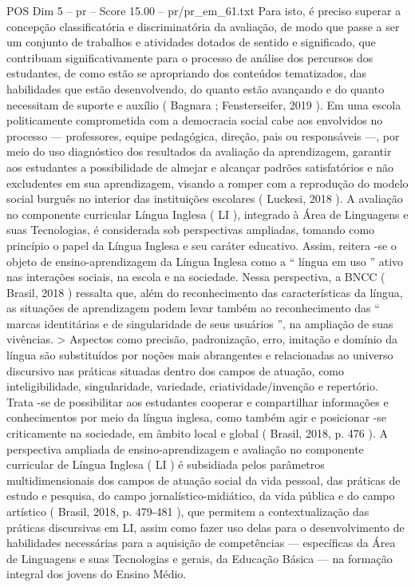 \begin{textsample}{POS Dim 5 – pr – Score 15.00 – pr/pr\_em\_61.txt}
Para isto, é preciso superar a concepção classificatória e discriminatória da avaliação, de modo que passe a ser um conjunto de trabalhos e atividades dotados de sentido e significado, que contribuam significativamente para o processo de análise dos percursos dos estudantes, de como estão se apropriando dos conteúdos tematizados, das habilidades que estão desenvolvendo, do quanto estão avançando e do quanto necessitam de suporte e auxílio ( Bagnara ; Fensterseifer, 2019 ).
Em uma escola politicamente comprometida com a democracia social cabe aos envolvidos no processo — professores, equipe pedagógica, direção, pais ou responsáveis —, por meio do uso diagnóstico dos resultados da avaliação da aprendizagem, garantir aos estudantes a possibilidade de almejar e alcançar padrões satisfatórios e não excludentes em sua aprendizagem, visando a romper com a reprodução do modelo social burguês no interior das instituições escolares ( Luckesi, 2018 ).
A avaliação no componente curricular Língua Inglesa ( LI ), integrado à Área de Linguagens e suas Tecnologias, é considerada sob perspectivas ampliadas, tomando como princípio o papel da Língua Inglesa e seu caráter educativo.
Assim, reitera -se o objeto de ensino-aprendizagem da Língua Inglesa como a “ língua em uso ” ativo nas interações sociais, na escola e na sociedade.
Nessa perspectiva, a BNCC ( Brasil, 2018 ) ressalta que, além do reconhecimento das características da língua, as situações de aprendizagem podem levar também ao reconhecimento das “ marcas identitárias e de singularidade de seus usuários ”, na ampliação de suas vivências. > Aspectos como precisão, padronização, erro, imitação e domínio da língua são substituídos por noções mais abrangentes e relacionadas ao universo discursivo nas práticas situadas dentro dos campos de atuação, como inteligibilidade, singularidade, variedade, criatividade/invenção e repertório.
Trata -se de possibilitar aos estudantes cooperar e compartilhar informações e conhecimentos por meio da língua inglesa, como também agir e posicionar -se criticamente na sociedade, em âmbito local e global ( Brasil, 2018, p. 476 ).
A perspectiva ampliada de ensino-aprendizagem e avaliação no componente curricular de Língua Inglesa ( LI ) é subsidiada pelos parâmetros multidimensionais dos campos de atuação social da vida pessoal, das práticas de estudo e pesquisa, do campo jornalístico-midiático, da vida pública e do campo artístico ( Brasil, 2018, p. 479-481 ), que permitem a contextualização das práticas discursivas em LI, assim como fazer uso delas para o desenvolvimento de habilidades necessárias para a aquisição de competências — específicas da Área de Linguagens e suas Tecnologias e gerais, da Educação Básica — na formação integral dos jovens do Ensino Médio.

\end{textsample}
